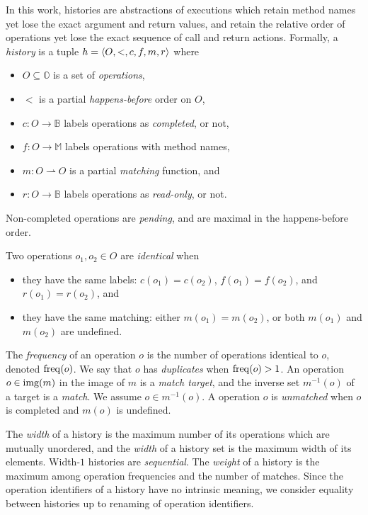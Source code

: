 In this work, histories are abstractions of executions which retain method
names yet lose the exact argument and return values, and retain the relative
order of operations yet lose the exact sequence of call and return actions.
Formally, a \emph{history} is a tuple $h = {\left\langle{O,<,c,f,m,r}\right\rangle}$ where
\begin{itemize}

  \item $O \subseteq \mathbb{O}$ is a set of \emph{operations},

  \item $<$ is a partial \emph{happens-before} order on $O$,

  \item $c: O \to \mathbb{B}$ labels operations as \emph{completed}, or not,

  \item $f: O \to \mathbb{M}$ labels operations with method names,

  \item $m: O \rightharpoonup O$ is a partial \emph{matching} function, and

  \item $r: O \to \mathbb{B}$ labels operations as \emph{read-only}, or not.

\end{itemize}
Non-completed operations are \emph{pending}, and are maximal in the
happens-before order. 

Two operations $o_1, o_2 \in O$ are \emph{identical} when
\begin{itemize}

  \item they have the same labels: $c(o_1) = c(o_2)$, $f(o_1)= f(o_2)$, and
  $r(o_1) = r(o_2)$, and

  \item they have the same matching: either $m(o_1) = m(o_2)$, or both $m(o_1)$
  and $m(o_2)$ are undefined.

\end{itemize} 
The \emph{frequency} of an operation $o$ is the number of operations identical
to $o$, denoted $\operatorname{freq}(o)$. We say that $o$ has \emph{duplicates} when
$\operatorname{freq}(o) > 1$. An operation $o \in \operatorname{img}(m)$ in the image of $m$ is a
\emph{match target}, and the inverse set $m^{-1}(o)$ of a target is a
\emph{match}. We assume $o \in m^{-1}(o)$. A operation $o$ is \emph{unmatched}
when $o$ is completed and $m(o)$ is undefined.

The \emph{width} of a history is the maximum number of its operations which are
mutually unordered, and the \emph{width} of a history set is the maximum width
of its elements. Width-$1$ histories are \emph{sequential}. The \emph{weight}
of a history is the maximum among operation frequencies and the number of
matches. Since the operation identifiers of a history have no intrinsic
meaning, we consider equality between histories up to renaming of operation
identifiers.

